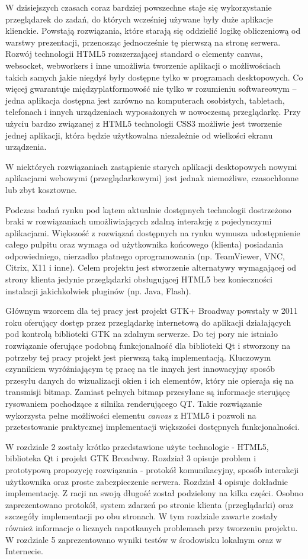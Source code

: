 
W dzisiejszych czasach coraz bardziej powszechne staje się wykorzystanie przeglądarek do zadań, do których wcześniej używane były duże aplikacje klienckie. Powstają rozwiązania, które starają się oddzielić logikę obliczeniową od warstwy prezentacji, przenosząc jednocześnie tę pierwszą na stronę serwera. Rozwój technologii HTML5 rozszerzającej standard o elementy canvas, websocket, webworkers i inne umożliwia tworzenie aplikacji o możliwościach takich samych jakie niegdyś były dostępne tylko w programach desktopowych. Co więcej gwarantuje międzyplatformowość nie tylko w rozumieniu softwareowym -- jedna aplikacja dostępna jest zarówno na komputerach osobistych, tabletach, telefonach i innych urządzeniach wyposażonych w nowoczesną przeglądarkę. Przy użyciu bardzo związanej z HTML5 technologii CSS3 możliwie jest tworzenie jednej aplikacji, która będzie użytkowalna niezależnie od wielkości ekranu urządzenia.

W niektórych rozwiązaniach zastąpienie starych aplikacji desktopowych nowymi aplikacjami webowymi (przeglądarkowymi) jest jednak niemożliwe, czasochłonne lub zbyt kosztowne.

Podczas badań rynku pod kątem aktualnie dostępnych technologii dostrzeżono braki w rozwiązaniach umożliwiających zdalną interakcję z pojedynczymi aplikacjami. Większość z rozwiązań dostępnych na rynku wymusza udostępnienie całego pulpitu oraz wymaga od użytkownika końcowego (klienta) posiadania odpowiedniego, nierzadko płatnego oprogramowania (np. TeamViewer, VNC, Citrix, X11 i inne). Celem projektu jest stworzenie alternatywy wymagającej od strony klienta jedynie przeglądarki obsługującej HTML5 bez konieczności instalacji jakichkolwiek pluginów (np. Java, Flash).

Głównym wzorcem dla tej pracy jest projekt GTK+ Broadway powstały w 2011 roku oferujący dostęp przez przeglądarkę internetową do aplikacji działających pod kontrolą biblioteki GTK na zdalnym serwerze. Do tej pory nie istniało rozwiązanie oferujące podobną funkcjonalność dla biblioteki Qt i stworzony na potrzeby tej pracy projekt jest pierwszą taką implementacją. Kluczowym czynnikiem wyróżniającym tę pracę na tle innych jest innowacyjny sposób przesyłu danych do wizualizacji okien i ich elementów, który nie opieraja się na transmisji bitmap. Zamiast pełnych bitmap przesyłane są informacje sterującę rysowaniem pochodzące z silnika renderującego QT.
Takie rozwiązanie wykorzysta pełne możliwości elementu \emph{canvas} z HTML5 i pozwoli na przetestowanie praktycznej implementacji większości dostępnych funkcjonalności.

W rozdziale 2 zostały krótko przedstawione użyte technologie - HTML5, biblioteka Qt i projekt GTK Broadway. Rozdział 3 opisuje problem i prototypową propozycję rozwiązania - protokół komunikacyjny, sposób interakcji użytkownika oraz proste zabezpieczenie serwera. Rozdział 4 opisuje dokładnie implementację. Z racji na swoją długość został podzielony na kilka części. Osobno zaprezentowano protokół, system zdarzeń po stronie klienta (przeglądarki) oraz szczegóły implementacji po obu stronach. W tym rozdziale zawarte zostały również informacje o licznych napotkanych problemach przy tworzeniu projektu. W rozdziale 5 zaprezentowano wyniki testów w środowisku lokalnym oraz w Internecie.